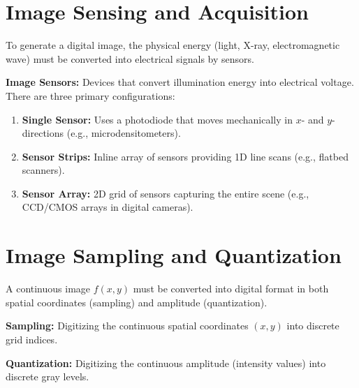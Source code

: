 \documentclass[12pt,a4paper]{article}
\begin{document}
\section{Image Sensing and Acquisition}

To generate a digital image, the physical energy (light, X-ray, electromagnetic wave) must be converted into electrical signals by sensors.

\begin{tcolorbox}[defbox, title={Image Sensor Configurations}]
\textbf{Image Sensors:} Devices that convert illumination energy into electrical voltage. There are three primary configurations:
\begin{enumerate}[label=(\alph*), leftmargin=*, itemsep=1pt]
  \item \textbf{Single Sensor:} Uses a photodiode that moves mechanically in $x$- and $y$-directions (e.g., microdensitometers).
  \item \textbf{Sensor Strips:} Inline array of sensors providing 1D line scans (e.g., flatbed scanners).
  \item \textbf{Sensor Array:} 2D grid of sensors capturing the entire scene (e.g., CCD/CMOS arrays in digital cameras).
\end{enumerate}
\end{tcolorbox}

\section{Image Sampling and Quantization}

A continuous image $f(x,y)$ must be converted into digital format in both spatial coordinates (sampling) and amplitude (quantization).

\begin{tcolorbox}[defbox, title={Sampling vs. Quantization}]
\textbf{Sampling:} Digitizing the continuous spatial coordinates $(x,y)$ into discrete grid indices.
\par\noindent
\textbf{Quantization:} Digitizing the continuous amplitude (intensity values) into discrete gray levels.
\end{tcolorbox}
\end{document}

